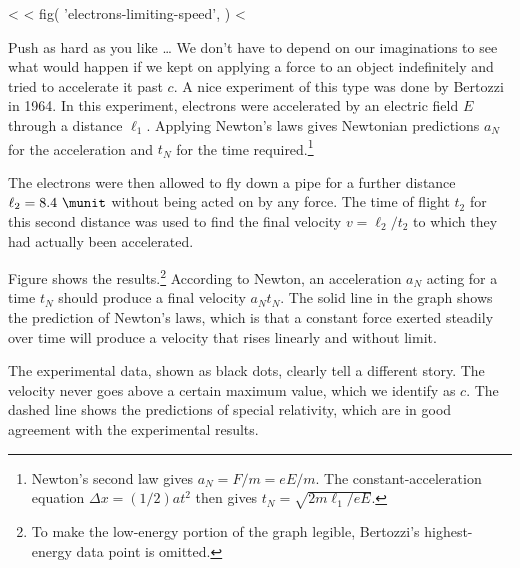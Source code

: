 <%
<%
  fig(
    'electrons-limiting-speed',
  )
<%

\begin{eg}{Push as hard as you like \ldots}\label{eg:bertozzi-graph}
We don't have to depend on our imaginations to see what would happen if we kept on applying
a force to an object indefinitely and tried to accelerate it past $c$.
A nice experiment of this type was done by Bertozzi in 1964.
In this experiment, electrons were accelerated by an electric field $E$ through a distance
$\ell_1$.
Applying Newton's laws
gives Newtonian predictions $a_N$ for the acceleration and $t_N$ for the time 
required.\footnote{Newton's second law gives
$a_N=F/m=eE/m$. The constant-acceleration
equation $\Delta x=(1/2)at^2$ then gives $t_N=\sqrt{2m\ell_1/eE}$.}

The electrons were then allowed to fly down a pipe for a further distance $\ell_2=8.4\ \munit$
without being acted on by any force. The time of flight $t_2$ for this second distance
was used to find the final
velocity $v=\ell_2/t_2$ to which they had actually been accelerated.

Figure  shows the results.\footnote{To make the
low-energy portion of the graph legible, Bertozzi's highest-energy
data point is omitted.}
According to Newton, an acceleration $a_N$ acting for a time $t_N$ should produce a final velocity
$a_N t_N$. The solid line in the
graph shows the prediction of Newton's laws, which is that a constant force exerted steadily over
time will produce a velocity that rises linearly and without limit.

The experimental data, shown as black dots, clearly tell a different story. The velocity never goes
above a certain maximum value,
which we identify as $c$. The dashed line shows the predictions of special relativity, which
are in good agreement with the experimental results.
\end{eg}
